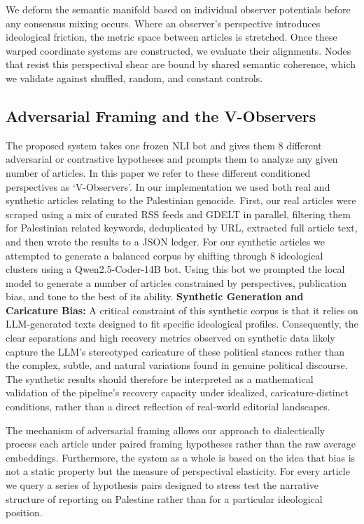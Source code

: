 We deform the semantic manifold based on individual observer potentials before any consensus mixing occurs. Where an observer's perspective introduces ideological friction, the metric space between articles is stretched. Once these warped coordinate systems are constructed, we evaluate their alignments. Nodes that resist this perspectival shear are bound by shared semantic coherence, which we validate against shuffled, random, and constant controls.

\subsection{Adversarial Framing and the V-Observers}

The proposed system takes one frozen NLI bot and gives them 8 different adversarial or contrastive hypotheses and prompts them to analyze any given number of articles. In this paper we refer to these different conditioned perspectives as `V-Observers'. In our implementation we used both real and synthetic articles relating to the Palestinian genocide. First, our real articles were scraped using a mix of curated RSS feeds and GDELT in parallel, filtering them for Palestinian related keywords, deduplicated by URL, extracted full article text, and then wrote the results to a JSON ledger. For our synthetic articles we attempted to generate a balanced corpus by shifting through 8 ideological clusters using a Qwen2.5-Coder-14B bot. Using this bot we prompted the local model to generate a number of articles constrained by perspectives, publication bias, and tone to the best of its ability. \textbf{Synthetic Generation and Caricature Bias:} A critical constraint of this synthetic corpus is that it relies on LLM-generated texts designed to fit specific ideological profiles. Consequently, the clear separations and high recovery metrics observed on synthetic data likely capture the LLM's stereotyped caricature of these political stances rather than the complex, subtle, and natural variations found in genuine political discourse. The synthetic results should therefore be interpreted as a mathematical validation of the pipeline's recovery capacity under idealized, caricature-distinct conditions, rather than a direct reflection of real-world editorial landscapes.

The mechanism of adversarial framing allows our approach to dialectically process each article under paired framing hypotheses rather than the raw average embeddings. Furthermore, the system as a whole is based on the idea that bias is not a static property but the measure of perspectival elasticity. For every article we query a series of hypothesis pairs designed to stress test the narrative structure of reporting on Palestine rather than for a particular ideological position.

